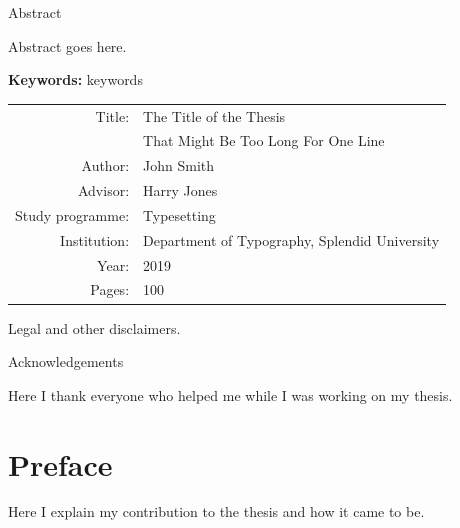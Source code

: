 \documentclass[a4paper,12pt,twoside]{report}
\def\headingStyle{\sffamily}
\begin{document}
\pagestyle{empty}



\centerline{\headingStyle\Large Abstract}

\bigskip
\noindent

Abstract goes here.

\lipsum[1]

\vfil

\noindent\textbf{Keywords:} keywords

\vfil

{\centering
\begin{tabular}{rl}
Title: & The Title of the Thesis	\\
 & That Might Be Too Long For One Line	\\
Author: & John Smith	\\
Advisor: & Harry Jones	\\
Study programme: & Typesetting	\\
Institution: & Department of Typography, Splendid University\\
Year: & 2019	\\
Pages: & 100
\end{tabular}
}

\vfil
\noindent
Legal and other disclaimers.

\lipsum[2]

\clearpage


\mbox{}
\vfil

\centerline{\headingStyle\Large Acknowledgements}

\bigskip

\noindent
Here I thank everyone who helped me while I was working on my thesis.

\lipsum[3-4]

\vfil

\clearpage

\pagestyle{fancy}

\tableofcontents
{}

\chapter*{Preface}


Here I explain my contribution to the thesis and how it came to be.
\end{document}

